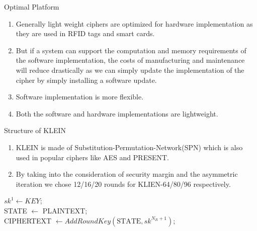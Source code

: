 \begin{frame}{Optimal Platform}
\begin{enumerate}
    \item Generally light weight ciphers are optimized for hardware implementation as they are used in RFID tags and smart cards.
    \item But if a system can support the computation and memory requirements of the software implementation, the costs of manufacturing and maintenance will reduce drastically as we can simply update the implementation of the cipher by simply installing a software update.
    \item Software implementation is more flexible.
    \item Both the software and hardware implementations are lightweight.
\end{enumerate}
\end{frame}
\begin{frame}{Structure of KLEIN}
\begin{enumerate}
    \item KLEIN is made of Substitution-Permutation-Network(SPN) which is also used in popular ciphers like AES and PRESENT.
    \item By taking into the consideration of security margin and the asymmetric iteration we chose 12/16/20 rounds for KLIEN-64/80/96 respectively.
\end{enumerate}
\begin{algorithm}[H]
\SetAlgoLined
$sk^{1}\gets KEY$; \\
STATE $\gets$ PLAINTEXT;\\
 CIPHERTEXT $\gets AddRoundKey(\text{STATE}, sk^{N_{R}+1} )$;
 \caption{KLEIN CIPHER}
\end{algorithm}
\end{frame}

